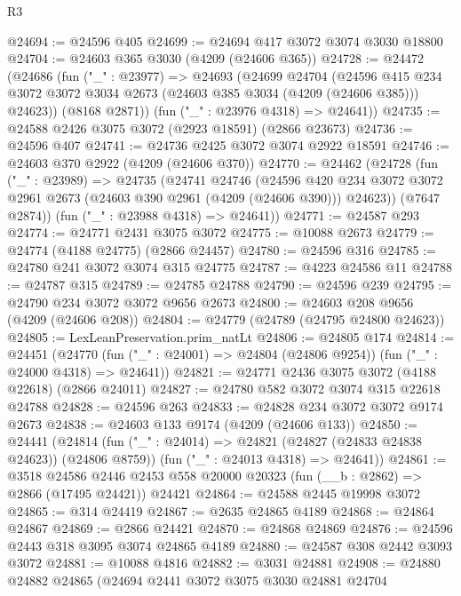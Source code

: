 \begin{lexlean}{R3}
\begin{coremodule}
@24694 := @24596 @405
@24699 := @24694 @417 @3072 @3074 @3030 @18800
@24704 := @24603 @365 @3030 (@4209 (@24606 @365))
@24728 := @24472
    (@24686
      (fun ("_" : @23977) =>
      @24693
        (@24699
          @24704
          (@24596
            @415
            @234
            @3072
            @3072
            @3034
            @2673
            (@24603 @385 @3034 (@4209 (@24606 @385)))
            @24623))
        (@8168 @2871))
      (fun ("_" : @23976 @4318) => @24641))
@24735 := @24588 @2426 @3075 @3072 (@2923 @18591) (@2866 @23673)
@24736 := @24596 @407
@24741 := @24736 @2425 @3072 @3074 @2922 @18591
@24746 := @24603 @370 @2922 (@4209 (@24606 @370))
@24770 := @24462
    (@24728
      (fun ("_" : @23989) =>
      @24735
        (@24741
          @24746
          (@24596
            @420
            @234
            @3072
            @3072
            @2961
            @2673
            (@24603 @390 @2961 (@4209 (@24606 @390)))
            @24623))
        (@7647 @2874))
      (fun ("_" : @23988 @4318) => @24641))
@24771 := @24587 @293
@24774 := @24771 @2431 @3075 @3072
@24775 := @10088 @2673
@24779 := @24774 (@4188 @24775) (@2866 @24457)
@24780 := @24596 @316
@24785 := @24780 @241 @3072 @3074 @315 @24775
@24787 := @4223 @24586 @11
@24788 := @24787 @315
@24789 := @24785 @24788
@24790 := @24596 @239
@24795 := @24790 @234 @3072 @3072 @9656 @2673
@24800 := @24603 @208 @9656 (@4209 (@24606 @208))
@24804 := @24779 (@24789 (@24795 @24800 @24623))
@24805 := LexLeanPreservation.prim_natLt
@24806 := @24805 @174
@24814 := @24451
    (@24770 (fun ("_" : @24001) => @24804 (@24806 @9254)) (fun ("_" : @24000 @4318) => @24641))
@24821 := @24771 @2436 @3075 @3072 (@4188 @22618) (@2866 @24011)
@24827 := @24780 @582 @3072 @3074 @315 @22618 @24788
@24828 := @24596 @263
@24833 := @24828 @234 @3072 @3072 @9174 @2673
@24838 := @24603 @133 @9174 (@4209 (@24606 @133))
@24850 := @24441
    (@24814
      (fun ("_" : @24014) => @24821 (@24827 (@24833 @24838 @24623)) (@24806 @8759))
      (fun ("_" : @24013 @4318) => @24641))
@24861 := @3518
    @24586
    @2446
    @2453
    @558
    @20000
    @20323
    (fun (__b : @2862) => @2866 (@17495 @24421))
    @24421
@24864 := @24588 @2445 @19998 @3072
@24865 := @314 @24419
@24867 := @2635 @24865 @4189
@24868 := @24864 @24867
@24869 := @2866 @24421
@24870 := @24868 @24869
@24876 := @24596 @2443 @318 @3095 @3074 @24865 @4189
@24880 := @24587 @308 @2442 @3093 @3072
@24881 := @10088 @4816
@24882 := @3031 @24881
@24908 := @24880
    @24882
    @24865
    (@24694
      @2441
      @3072
      @3075
      @3030
      @24881
      @24704

\end{coremodule}
\end{lexlean}
